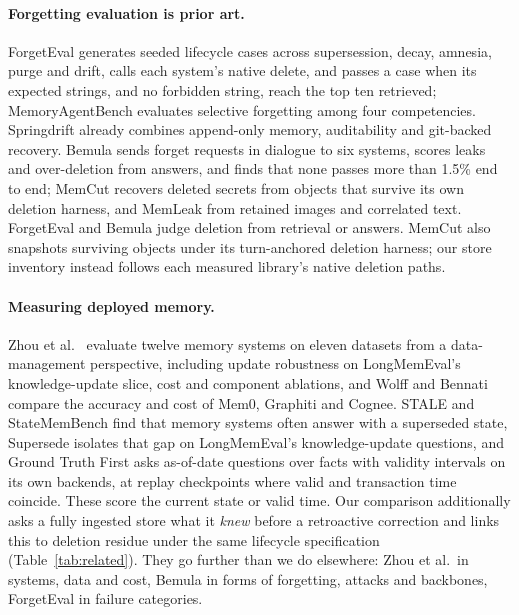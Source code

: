 \documentclass[conference]{IEEEtran}
\begin{document}
\paragraph{Forgetting evaluation is prior art.}
ForgetEval \citep{forgetevalpaper,forgeteval} generates seeded lifecycle cases
across supersession, decay, amnesia, purge and drift, calls each system's native
delete, and passes a case when its expected strings, and no forbidden string,
reach the top ten retrieved; MemoryAgentBench \citep{memoryagentbench} evaluates selective
forgetting among four competencies. Springdrift \citep{springdrift} already
combines append-only memory, auditability and git-backed recovery. Bemula
\citep{bemula} sends forget requests in dialogue to six systems, scores leaks and
over-deletion from answers, and finds that none passes more than 1.5\% end to
end; MemCut \citep{memcut} recovers deleted secrets from objects that survive
its own deletion harness, and MemLeak \citep{memleak} from retained images and
correlated text. ForgetEval and Bemula judge deletion from retrieval or
answers. MemCut also snapshots surviving objects under its turn-anchored
deletion harness; our store inventory instead follows each measured library's
native deletion paths.

\paragraph{Measuring deployed memory.}
Zhou et al.\ \citep{agentnative} evaluate twelve memory systems on eleven
datasets from a data-management perspective, including update robustness on
LongMemEval's knowledge-update slice, cost and component ablations, and Wolff
and Bennati \citep{wolffcost} compare the accuracy and cost of Mem0, Graphiti and
Cognee. STALE \citep{stale} and StateMemBench \citep{statemembench} find that
memory systems often answer with a superseded state, Supersede \citep{supersede}
isolates that gap on LongMemEval's knowledge-update questions, and Ground Truth
First \citep{groundtruthfirst} asks as-of-date questions over facts with
validity intervals on its own backends, at replay checkpoints where valid and
transaction time coincide. These score the current state or valid time. Our comparison additionally
asks a fully ingested store what it \emph{knew} before a retroactive correction
and links this to deletion residue under the same lifecycle specification
(Table~\ref{tab:related}). They go further than we do elsewhere: Zhou et al.\ in
systems, data and cost, Bemula in forms of forgetting, attacks and backbones,
ForgetEval in failure categories.
\end{document}
